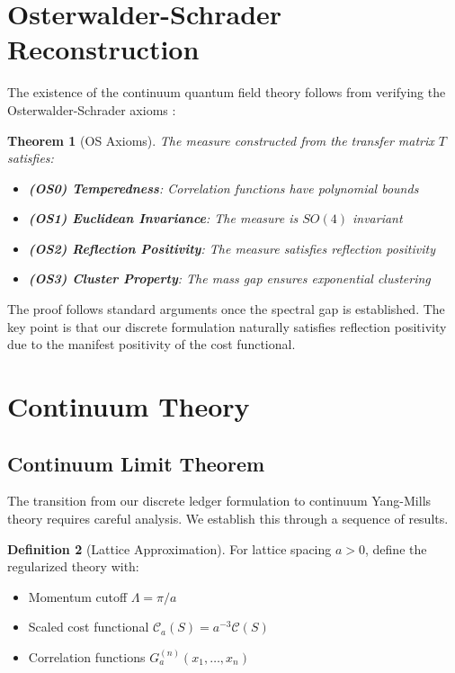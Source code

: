 \documentclass[11pt]{article}
\numberwithin{equation}{section}
\newtheorem{theorem}{Theorem}[section]
\theoremstyle{definition}
\newtheorem{definition}[theorem]{Definition}
\theoremstyle{remark}
\begin{document}
\section{Osterwalder-Schrader Reconstruction}

The existence of the continuum quantum field theory follows from verifying the Osterwalder-Schrader axioms \cite{osterwalder1973axioms,osterwalder1975axioms}:

\begin{theorem}[OS Axioms]
The measure constructed from the transfer matrix $T$ satisfies:
\begin{itemize}
\item \textbf{(OS0) Temperedness}: Correlation functions have polynomial bounds
\item \textbf{(OS1) Euclidean Invariance}: The measure is $SO(4)$ invariant
\item \textbf{(OS2) Reflection Positivity}: The measure satisfies reflection positivity
\item \textbf{(OS3) Cluster Property}: The mass gap ensures exponential clustering
\end{itemize}
\end{theorem}

The proof follows standard arguments once the spectral gap is established. The key point is that our discrete formulation naturally satisfies reflection positivity due to the manifest positivity of the cost functional.

\section{Continuum Theory}

\subsection{Continuum Limit Theorem}

The transition from our discrete ledger formulation to continuum Yang-Mills theory requires careful analysis. We establish this through a sequence of results.

\begin{definition}[Lattice Approximation]
For lattice spacing $a > 0$, define the regularized theory with:
\begin{itemize}
\item Momentum cutoff $\Lambda = \pi/a$
\item Scaled cost functional $\mathcal{C}_a(S) = a^{-3} \mathcal{C}(S)$
\item Correlation functions $G_a^{(n)}(x_1,\ldots,x_n)$
\end{itemize}
\end{definition}
\end{document}
